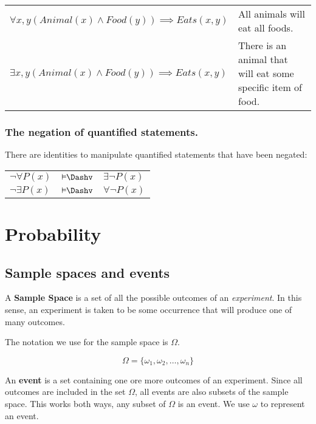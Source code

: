 \begin{tabularx}{\textwidth}{l X}
	$\forall x, y \left(Animal(x) \wedge Food(y)\right) \implies Eats(x, y)$ & All animals will eat all foods.\\
	$\exists x, y \left(Animal(x) \wedge Food(y)\right) \implies Eats(x, y)$ & There is an animal that will eat some specific item of food.\\
\end{tabularx}

\subsubsection{The negation of quantified statements.}

There are identities to manipulate quantified statements that have been negated:

\begin{center}
	\begin{tabular}{l c l}
		$\neg \forall P(x)$ & $\logicEquiv$ & $\exists \neg P(x)$\\
		$\neg \exists P(x)$ & $\logicEquiv$ & $\forall \neg P(x)$\\
	\end{tabular}
\end{center}

\section{Probability}

\subsection{Sample spaces and events}

A {\bf Sample Space} is a set of all the possible outcomes of an {\it
experiment}. In this sense, an experiment is taken to be some occurrence that
will produce one of many outcomes.

The notation we use for the sample space is $\Omega$.

\begin{dmath*}
	\Omega = \{\omega_1, \omega_2, \ldots, \omega_n\}
\end{dmath*}

An {\bf event} is a set containing one ore more outcomes of an experiment. Since
all outcomes are included in the set $\Omega$, all events are also subsets of
the sample space. This works both ways, any subset of $\Omega$ is an event. We
use $\omega$ to represent an event.

